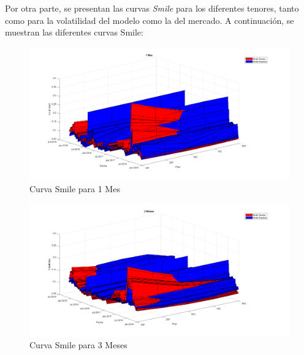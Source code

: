 \noindent Por otra parte, se presentan las curvas \textit{Smile} para los diferentes tenores, tanto como para la volatilidad del modelo como la del mercado. A continuación, se muestran las diferentes curvas Smile: 
\begin{figure}[H]
    \begin{center}
    \includegraphics[width = 14cm]{figures/Smile3d1Mes.png}
    \caption{Curva Smile para 1 Mes}
    \label{Smile1} %
    \end{center}
\end{figure}
\begin{figure}[H]
    \begin{center}
    \includegraphics[width = 14cm]{figures/Smile3d3Meses.png}
    \caption{Curva Smile para 3 Meses}
    \label{Smile2} %
    \end{center}
\end{figure}

